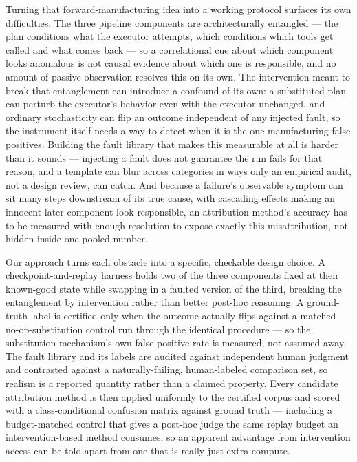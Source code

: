 \documentclass[11pt]{article}
\begin{document}
Turning that forward-manufacturing idea into a working protocol surfaces its own difficulties. The three pipeline components are architecturally entangled --- the plan conditions what the executor attempts, which conditions which tools get called and what comes back --- so a correlational cue about which component looks anomalous is not causal evidence about which one is responsible, and no amount of passive observation resolves this on its own. The intervention meant to break that entanglement can introduce a confound of its own: a substituted plan can perturb the executor's behavior even with the executor unchanged, and ordinary stochasticity can flip an outcome independent of any injected fault, so the instrument itself needs a way to detect when it is the one manufacturing false positives. Building the fault library that makes this measurable at all is harder than it sounds --- injecting a fault does not guarantee the run fails for that reason, and a template can blur across categories in ways only an empirical audit, not a design review, can catch. And because a failure's observable symptom can sit many steps downstream of its true cause, with cascading effects making an innocent later component look responsible, an attribution method's accuracy has to be measured with enough resolution to expose exactly this misattribution, not hidden inside one pooled number.

Our approach turns each obstacle into a specific, checkable design choice. A checkpoint-and-replay harness holds two of the three components fixed at their known-good state while swapping in a faulted version of the third, breaking the entanglement by intervention rather than better post-hoc reasoning. A ground-truth label is certified only when the outcome actually flips against a matched no-op-substitution control run through the identical procedure --- so the substitution mechanism's own false-positive rate is measured, not assumed away. The fault library and its labels are audited against independent human judgment and contrasted against a naturally-failing, human-labeled comparison set, so realism is a reported quantity rather than a claimed property. Every candidate attribution method is then applied uniformly to the certified corpus and scored with a class-conditional confusion matrix against ground truth --- including a budget-matched control that gives a post-hoc judge the same replay budget an intervention-based method consumes, so an apparent advantage from intervention access can be told apart from one that is really just extra compute.
\end{document}
